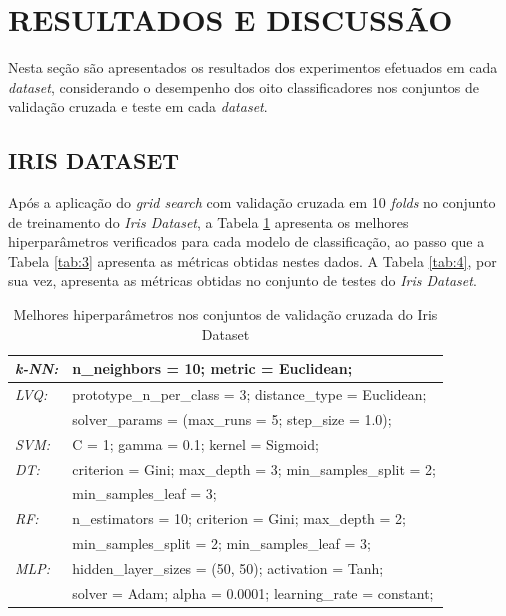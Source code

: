 \documentclass[journal]{IEEEtran}
\begin{document}
\section{RESULTADOS E DISCUSSÃO}

Nesta seção são apresentados os resultados dos experimentos efetuados em cada \textit{dataset}, considerando o desempenho dos oito classificadores nos conjuntos de validação cruzada e teste em cada \textit{dataset}.

\subsection{IRIS DATASET}

Após a aplicação do \textit{grid search} com validação cruzada em 10 \textit{folds} no conjunto de treinamento do \textit{Iris Dataset}, a Tabela \ref{tab:2} apresenta os melhores hiperparâmetros verificados para cada modelo de classificação, ao passo que a Tabela \ref{tab:3} apresenta as métricas obtidas nestes dados. A Tabela \ref{tab:4}, por sua vez, apresenta as métricas obtidas no conjunto de testes do \textit{Iris Dataset}.

\begin{table}[h!]
	\caption{Melhores hiperparâmetros nos conjuntos de validação cruzada do Iris Dataset}
	\label{tab:2}
	\begin{tabular}{ l l }
		\hline
		\textit{k-NN:} & n\_neighbors = 10; metric = Euclidean;                     \\
		\hline
		\textit{LVQ:}  & prototype\_n\_per\_class = 3; distance\_type = Euclidean;  \\  & solver\_params = (max\_runs = 5; step\_size = 1.0);\\
		\hline
		\textit{SVM:}  & C = 1; gamma = 0.1; kernel = Sigmoid;                      \\
		\hline
		\textit{DT:}   & criterion = Gini; max\_depth = 3; min\_samples\_split = 2; \\  & min\_samples\_leaf = 3;\\
		\hline
		\textit{RF:}   & n\_estimators = 10; criterion = Gini; max\_depth = 2;      \\  & min\_samples\_split = 2; min\_samples\_leaf = 3;\\
		\hline
		\textit{MLP:}  & hidden\_layer\_sizes = (50, 50); activation = Tanh;        \\  & solver = Adam; alpha = 0.0001; learning\_rate = constant;\\
		\hline
	\end{tabular}
\end{table}
\end{document}
